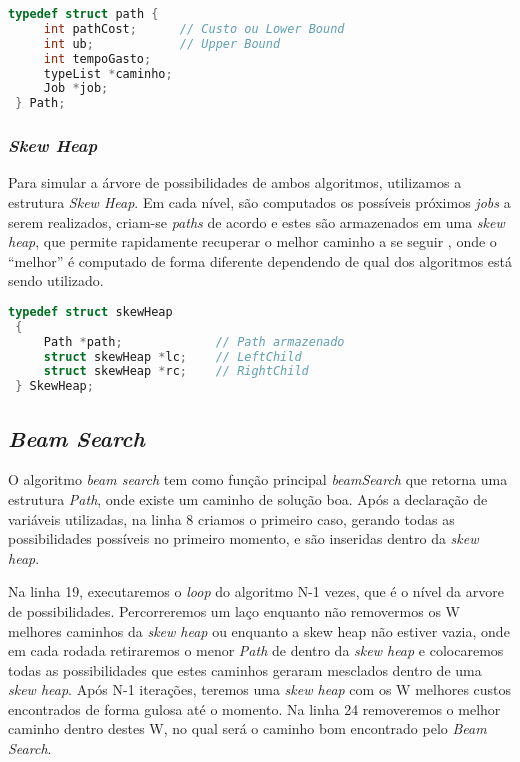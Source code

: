\documentclass[
	11pt,				%
	oneside,			%
	a4paper,			%
	english,			%
	brazil,				%
	]{article}
\begin{document}
\begin{lstlisting}[language=C, caption=Estrutura \textit{Path}]
 typedef struct path {
     int pathCost;      // Custo ou Lower Bound
     int ub;            // Upper Bound
     int tempoGasto;
     typeList *caminho;
     Job *job;
 } Path;
\end{lstlisting}

\subsubsection{\textit{Skew Heap}}
Para simular a árvore de possibilidades de ambos algoritmos, utilizamos a estrutura \textit{Skew Heap}. Em cada nível, são computados os possíveis próximos \textit{jobs} a serem realizados, criam-se \textit{paths} de acordo e estes são armazenados em uma \textit{skew heap}, que permite rapidamente recuperar o melhor caminho a se seguir \cite{sh}, onde o ``melhor'' é computado de forma diferente dependendo de qual dos algoritmos está sendo utilizado.

\begin{lstlisting}[language=C, caption=Estrutura \textit{SkewHeap}]
 typedef struct skewHeap
 {
     Path *path;             // Path armazenado
     struct skewHeap *lc;    // LeftChild
     struct skewHeap *rc;    // RightChild
 } SkewHeap;
\end{lstlisting}

\subsection{\textit{Beam Search}}
O algoritmo \textit{beam search} tem como função principal \textit{beamSearch} que retorna uma estrutura \textit{Path}, onde existe um caminho de solução boa. Após a declaração de variáveis utilizadas, na linha 8 criamos o primeiro caso, gerando todas as possibilidades possíveis no primeiro momento, e são inseridas dentro da \textit{skew heap}.

Na linha 19, executaremos o \textit{loop} do algoritmo N-1 vezes, que é o nível da arvore de possibilidades. Percorreremos um laço enquanto não removermos os W melhores caminhos da \textit{skew heap} ou enquanto a skew heap não estiver vazia, onde em cada rodada retiraremos o menor \textit{Path} de dentro da \textit{skew heap} e colocaremos todas as possibilidades que estes caminhos geraram mesclados dentro de uma \textit{skew heap}. Após N-1 iterações, teremos uma \textit{skew heap} com os W melhores custos encontrados de forma gulosa até o momento. Na linha 24 removeremos o melhor caminho dentro destes W, no qual será o caminho bom encontrado pelo \textit{Beam Search}.
\end{document}
